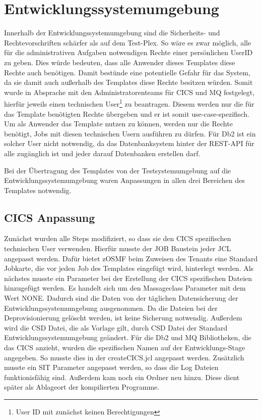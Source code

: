 \section{Entwicklungssystemumgebung}
Innerhalb der Entwicklungssystemumgebung sind die Sicherheits- und Rechtevorschriften schärfer als auf dem Test-Plex.
So wäre es zwar möglich, alle für die administrativen Aufgaben notwendigen Rechte einer persönlichen UserID zu geben.
Dies würde bedeuten, dass alle Anwender dieses Templates diese Rechte auch benötigen.
Damit bestünde eine potentielle Gefahr für das System, da sie damit auch außerhalb des Templates diese Rechte besitzen würden.
Somit wurde in Absprache mit den Administratorenteams für CICS und MQ festgelegt, hierfür jeweils einen technischen User\footnote{User ID mit zunächst keinen Berechtigungen} zu beantragen.
Diesem werden nur die für das Template benötigten Rechte übergeben und er ist somit use-case-spezifisch.
Um als Anwender das Template nutzen zu können, werden nur die Rechte benötigt, Jobs mit diesen technischen Usern ausführen zu dürfen.
Für Db2 ist ein solcher User nicht notwendig, da das Datenbanksystem hinter der REST-API für alle zugänglich ist und jeder darauf Datenbanken erstellen darf.

Bei der Übertragung des Templates von der Testsystemumgebung auf die Entwicklungssystemumgebung waren Anpassungen in allen drei Bereichen des Templates notwendig.

\subsection{CICS Anpassung}
Zunächst wurden alle Steps modifiziert, so dass sie den CICS spezifischen technischen User verwenden.
Hierfür musste der \glqq JOB\grqq{} Baustein jeder JCL angepasst werden.
Dafür bietet zOSMF beim Zuweisen des \glqq Tenants\grqq{} eine Standard Jobkarte, die vor jeden Job des Templates eingefügt wird, hinterlegt werden.
Als nächstes musste ein Parameter bei der Erstellung der CICS spezifischen Dateien hinzugefügt werden.
Es handelt sich um den Massageclass Parameter mit dem Wert \glqq NONE\grqq.
Dadurch sind die Daten von der täglichen Datensicherung der Entwicklungssystemumgebung ausgenommen.
Da die Dateien bei der Deprovisionierung gelöscht werden, ist keine Sicherung notwendig.
Außerdem wird die CSD Datei, die als Vorlage gilt, durch CSD Datei der Standard Entwicklungssystemumgebung geändert.
Für die Db2 und MQ Bibliotheken, die das CICS anzieht, wurden die spezifischen Namen auf der Entwicklungs-Stage angegeben.
So musste dies in der \glqq createCICS.jcl\grqq{} angepasst werden.
Zusätzlich musste ein SIT Parameter angepasst werden, so dass die Log Dateien funktionisfähig sind.
Außerdem kam noch ein Ordner neu hinzu.
Diese dient später als Ablageort der kompilierten Programme.

